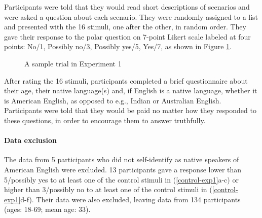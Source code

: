\documentclass[11pt,fleqn]{article}
\newcommand{\6}{\mbox{$[\hspace*{-.6mm}[$}}
\newcommand{\9}{\mbox{$]\hspace*{-.6mm}]$}}
\begin{document}
Participants were told that they would read short descriptions of scenarios and were asked a question about each scenario. They were randomly assigned to a list and presented with the 16 stimuli, one after the other, in random order. They gave their response to the polar question on 7-point Likert scale labeled at four points: No/1, Possibly
no/3, Possibly yes/5, Yes/7, as shown in Figure \ref{f-trial-exp1}. 

\begin{figure}[h!]
\centering


\caption{A sample trial in Experiment 1}\label{f-trial-exp1}
\end{figure}

After rating the 16 stimuli, participants completed a brief questionnaire about their age, their
native language(s) and, if English is a native language, whether it is
American English, as opposed to e.g., Indian or Australian English.
Participants were told that they would be paid no matter how they
responded to these questions, in order to encourage them to answer
truthfully.


\paragraph{Data exclusion} The data from 5 participants who did not self-identify as native speakers of American English were excluded. 13 participants gave a response lower than 5/possibly yes to at least one of the control stimuli in (\ref{control-exp1}a-c) or higher than 3/possibly no to at least one of the control stimuli in (\ref{control-exp1}d-f). Their data  were also excluded, leaving data from 134 participants (ages: 18-69; mean age: 33).
\end{document}
